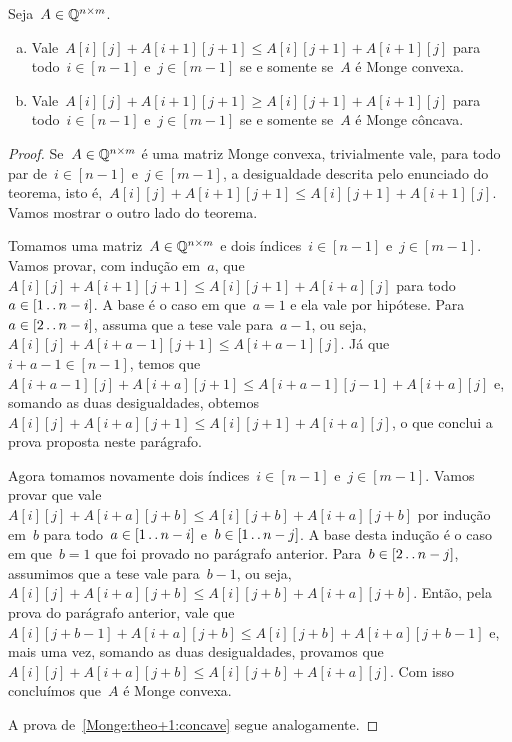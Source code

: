 \begin{theo} \label{Monge:theo+1}
Seja~$A \in \mathbb{Q}^{n \times m}$.

\begin{enumerate}[(a)]
\item Vale~${A[i][j] + A[i+1][j+1] \leq A[i][j+1] + A[i+1][j]}$ para todo~${i \in [n-1]}$ e~${j \in [m-1]}$ se e somente se~$A$ é Monge convexa. \label{Monge:theo+1:convex}

\item Vale~${A[i][j] + A[i+1][j+1] \geq A[i][j+1] + A[i+1][j]}$ para todo~${i \in [n-1]}$ e~${j \in [m-1]}$ se e somente se~$A$ é Monge côncava. \label{Monge:theo+1:concave}
\end{enumerate}
\end{theo}

\begin{proof}
Se~$A \in \mathbb{Q}^{n \times m}$ é uma matriz Monge convexa, trivialmente vale, para todo par de~${ i \in [n-1] }$ e~${ j \in [m-1] }$, a desigualdade descrita pelo enunciado do teorema, isto é,~${ A[i][j] + A[i+1][j+1] \leq A[i][j+1] + A[i+1][j] }$. Vamos mostrar o outro lado do teorema.

Tomamos uma matriz~$A \in \mathbb{Q}^{n \times m}$ e dois índices~${ i \in [n-1] }$ e~${ j \in [m-1] }$. Vamos provar, com indução em~$a$, que~${ A[i][j] + A[i+1][j+1] \leq A[i][j+1] + A[i+a][j] }$ para todo~${ a \in [1 \,.\,.\, n-i ] }$. A base é o caso em que~${ a = 1 }$ e ela vale por hipótese. Para~${ a \in [2 \,.\,.\, n-i] }$, assuma que a tese vale para~${ a-1 }$, ou seja,~${ A[i][j] + A[i + a - 1][j+1] \leq A[i + a - 1][j] }$. Já que~${ i + a - 1  \in [n-1] }$, temos que~${ A[i+a-1][j] + A[i+a][j+1] \leq A[i+a-1][j-1] + A[i+a][j] }$ e, somando as duas desigualdades, obtemos~${ A[i][j] + A[i+a][j+1] \leq A[i][j+1] + A[i+a][j] }$, o que conclui a prova proposta neste parágrafo.

Agora tomamos novamente dois índices~${ i \in [n-1] }$ e~${ j \in [m-1] }$. Vamos provar que vale~${ A[i][j] + A[i+a][j+b] \leq A[i][j+b] + A[i+a][j+b] }$ por indução em~$b$ para todo~${ a \in [1 \,.\,.\, n-i] }$ e~${ b \in [1 \,.\,.\, n-j] }$. A base desta indução é o caso em que~${ b = 1 }$ que foi provado no parágrafo anterior. Para~${ b \in [2 \,.\,.\, n-j] }$, assumimos que a tese vale para~${ b-1 }$, ou seja,~${ A[i][j] + A[i+a][j+b] \leq A[i][j+b] + A[i+a][j+b] }$. Então, pela prova do parágrafo anterior, vale que~${ A[i][j + b - 1] + A[i+a][j+b] \leq A[i][j+b] + A[i+a][j+b-1] }$ e, mais uma vez, somando as duas desigualdades, provamos que~${ A[i][j] + A[i+a][j+b] \leq A[i][j+b] + A[i+a][j] }$. Com isso concluímos que~$A$ é Monge convexa.

A prova de~\ref{Monge:theo+1:concave} segue analogamente.
\end{proof}

